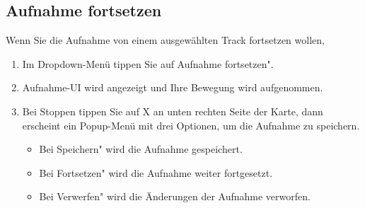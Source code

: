 \documentclass{article}
\begin{document}
\subsection{Aufnahme fortsetzen}
	Wenn Sie die Aufnahme von einem ausgewählten Track fortsetzen wollen,
	\begin{enumerate}
		\item Im Dropdown-Menü tippen Sie auf \glqq Aufnahme fortsetzen".
		\item Aufnahme-UI wird angezeigt und Ihre Bewegung wird aufgenommen.
		\item Bei Stoppen tippen Sie auf \glqq X \grqq an unten rechten Seite der Karte, dann erscheint ein Popup-Menü mit drei Optionen, um die Aufnahme zu speichern.
			\begin{itemize}
				\item Bei \glqq Speichern" wird die Aufnahme gespeichert.
				\item Bei \glqq Fortsetzen" wird die Aufnahme weiter fortgesetzt.
				\item Bei \glqq Verwerfen" wird die Änderungen der Aufnahme verworfen.
			\end{itemize}
	\end{enumerate}
\end{document}
